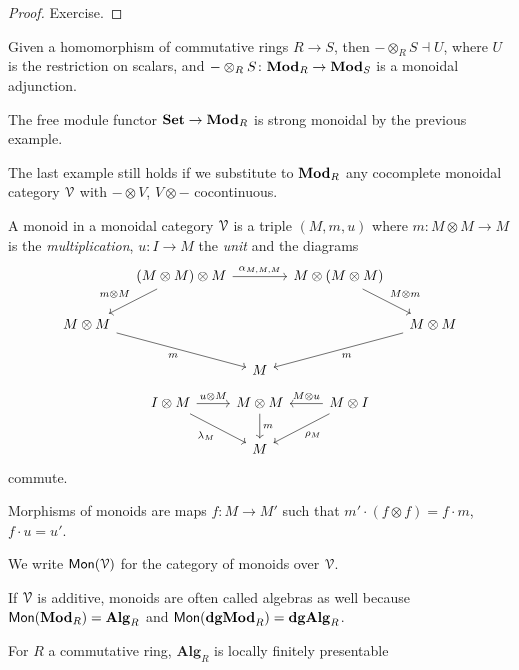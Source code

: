 \documentclass[a4paper,11pt,oneside,openany]{scrbook}
\begin{document}
\begin{proof}
	Exercise.
\end{proof}

\begin{exmp}
	Given a homomorphism of commutative rings $R\rightarrow S$, then
    $-\otimes_RS\dashv U$, where $U$ is the restriction on scalars, and
    $-\otimes_RS\colon{\normalfont\textbf{Mod}}_R\rightarrow{\normalfont\textbf{Mod}}_S$ is a monoidal adjunction.

	The free module functor ${\normalfont\textbf{Set}}\rightarrow{\normalfont\textbf{Mod}}_R$ is strong monoidal by the previous example.
\end{exmp}

\begin{rmk}
	The last example still holds if we substitute to ${\normalfont\textbf{Mod}}_R$ any cocomplete monoidal category $\operatorname{\mathcal{V}}$ with $-\otimes V$, $V\otimes -$ cocontinuous.
\end{rmk}

\begin{defn}
	A monoid in a monoidal category $\operatorname{\mathcal{V}}$ is a triple $(M,m,u)$ where $m\colon M\otimes M\rightarrow M$ is the \emph{multiplication}, $u\colon I\rightarrow M$ the \emph{unit} and the diagrams
	\[
		\begin{tikzcd}[column sep=1.0em]
			& (M\otimes M)\otimes M\ar[rr, "\alpha_{M,M,M}"]\ar[dl, "m\otimes M", swap]
			&& M\otimes (M\otimes M)\ar[dr, "M\otimes m"] \\
			M\otimes M\ar[drr, "m", swap]
			&&&& M\otimes M\ar[dll, "m"] \\
			&& M
		\end{tikzcd}
	\]
	\[
		\begin{tikzcd}
			I\otimes M\ar[r, "u\otimes M"]\ar[dr, "\lambda_M", swap]
			& M\otimes M\ar[d, "m"]
			& M\otimes I\ar[l, "M\otimes u", swap]\ar[dl, "\rho_M"] \\
			& M
		\end{tikzcd}
	\]
	commute.

	Morphisms of monoids are maps $f\colon M\rightarrow M'$ such that
    $m'\cdot(f\otimes f)=f\cdot m$, $f\cdot u=u'$.

	We write $\operatorname{\mathsf{Mon}}(\operatorname{\mathcal{V}})$ for the category of monoids over $\operatorname{\mathcal{V}}$.
\end{defn}

\begin{rmk}
	If $\operatorname{\mathcal{V}}$ is additive, monoids are often called algebras as well because     $\operatorname{\mathsf{Mon}}({\normalfont\textbf{Mod}}_R)=\mathbf{Alg}_R$ and $\operatorname{\mathsf{Mon}}({\normalfont\textbf{dgMod}}_R)=\mathbf{dgAlg}_R$.
\end{rmk}


\begin{exmp}
	For $ R $ a commutative ring, $ \mathbf{Alg}_R $ is locally finitely presentable
\end{exmp}
\end{document}
